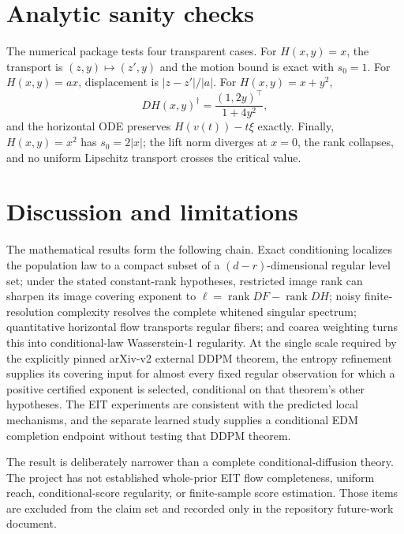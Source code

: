 \documentclass[11pt]{article}
\theoremstyle{definition}
\newcommand{\rank}{\operatorname{rank}}
\begin{document}
\section{Analytic sanity checks}

The numerical package tests four transparent cases.  For $H(x,y)=x$, the
transport is $(z,y)\mapsto(z',y)$ and the motion bound is exact with $s_0=1$.
For $H(x,y)=ax$, displacement is $|z-z'|/|a|$.  For
$H(x,y)=x+y^2$,
\[
 DH(x,y)^\dagger=\frac{(1,2y)^\top}{1+4y^2},
\]
and the horizontal ODE preserves $H(v(t))-t\xi$ exactly.  Finally,
$H(x,y)=x^2$ has $s_0=2|x|$; the lift norm diverges at $x=0$, the rank
collapses, and no uniform Lipschitz transport crosses the critical value.

\section{Discussion and limitations}

The mathematical results form the following chain.  Exact conditioning
localizes the population law to a compact subset of a $(d-r)$-dimensional
regular level set; under the stated constant-rank hypotheses, restricted image
rank can sharpen its image covering exponent to
$\ell=\rank DF-\rank DH$; noisy finite-resolution
complexity resolves the complete whitened singular spectrum; quantitative
horizontal flow transports regular fibers; and coarea weighting turns this
into conditional-law Wasserstein-1 regularity.  At the single scale required
by the explicitly pinned arXiv-v2 external DDPM theorem, the entropy refinement
supplies its covering input for almost every fixed regular observation for
which a positive certified exponent is selected, conditional on that theorem's
other hypotheses.  The EIT experiments are consistent with the predicted
local mechanisms, and the separate learned study supplies a conditional EDM
completion endpoint without testing that DDPM theorem.

The result is deliberately narrower than a complete conditional-diffusion
theory.  The project has not established whole-prior EIT flow completeness,
uniform reach, conditional-score regularity, or finite-sample score estimation.
Those items are excluded from the claim set and recorded only in the repository
future-work document.



\end{document}
